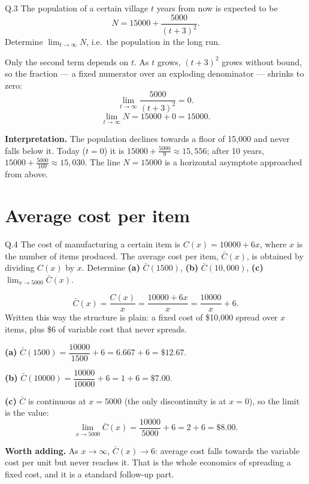 \begin{question}{Q.3}
The population of a certain village $t$ years from now is expected to be
\[
N=15000+\frac{5000}{(t+3)^{2}} .
\]
Determine $\displaystyle\lim_{t\to\infty}N$, i.e.\ the population in the long
run.
\end{question}

\begin{solution}
Only the second term depends on $t$. As $t$ grows, $(t+3)^{2}$ grows without
bound, so the fraction --- a fixed numerator over an exploding denominator ---
shrinks to zero:
\[
\lim_{t\to\infty}\frac{5000}{(t+3)^{2}}=0 .
\]
\[
\lim_{t\to\infty}N=15000+0=15000 .
\]

\medskip
\textbf{Interpretation.} The population declines towards a floor of 15{,}000 and
never falls below it. Today ($t=0$) it is
$15000+\tfrac{5000}{9}\approx 15{,}556$; after 10 years,
$15000+\tfrac{5000}{169}\approx 15{,}030$. The line $N=15000$ is a horizontal
asymptote approached from above.

\end{solution}

\section{Average cost per item}

\begin{question}{Q.4}
The cost of manufacturing a certain item is $C(x)=10000+6x$, where $x$ is the
number of items produced. The average cost per item, $\bar{C}(x)$, is obtained
by dividing $C(x)$ by $x$. Determine
\textbf{(a)} $\bar{C}(1500)$, \textbf{(b)} $\bar{C}(10{,}000)$,
\textbf{(c)} $\displaystyle\lim_{x\to 5000}\bar{C}(x)$.
\end{question}

\begin{solution}
\[
\bar{C}(x)=\frac{C(x)}{x}=\frac{10000+6x}{x}=\frac{10000}{x}+6 .
\]
Written this way the structure is plain: a fixed cost of \$10{,}000 spread over
$x$ items, plus \$6 of variable cost that never spreads.

\medskip
\textbf{(a)} $\bar{C}(1500)=\dfrac{10000}{1500}+6=6.667+6=\$12.67$.

\textbf{(b)} $\bar{C}(10000)=\dfrac{10000}{10000}+6=1+6=\$7.00$.

\textbf{(c)} $\bar{C}$ is continuous at $x=5000$ (the only discontinuity is at
$x=0$), so the limit is the value:
\[
\lim_{x\to5000}\bar{C}(x)=\frac{10000}{5000}+6=2+6=\$8.00 .
\]

\medskip
\textbf{Worth adding.} As $x\to\infty$, $\bar{C}(x)\to 6$: average cost falls
towards the variable cost per unit but never reaches it. That is the whole
economics of spreading a fixed cost, and it is a standard follow-up part.

\end{solution}

